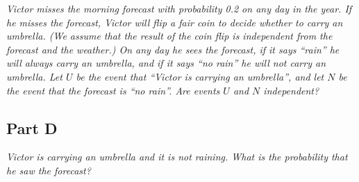 \documentclass{article}
\begin{document}
\textit{Victor misses the morning forecast with probability 0.2 on any day in
the year. If he misses the forecast, Victor will flip a fair coin to decide
whether to carry an umbrella. (We assume that the result of the coin flip is
independent from the forecast and the weather.) On any day he sees the forecast,
if it says “rain” he will always carry an umbrella, and if it says “no rain” he
will not carry an umbrella. Let $ U $ be the event that “Victor is carrying an
umbrella”, and let $ N $ be the event that the forecast is “no rain”. Are events
$ U $ and $ N $ independent?}

\subsection*{Part D}

\textit{Victor is carrying an umbrella and it is not raining. What is the
probability that he saw the forecast?}
\end{document}
